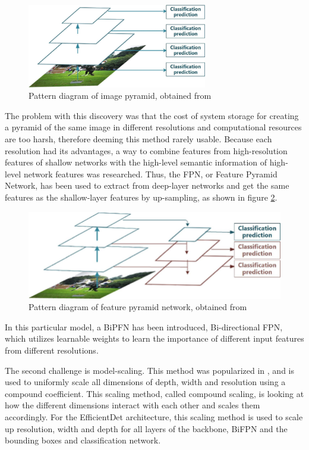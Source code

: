 \begin{figure}[!ht]
    \centering
    \includegraphics[width=0.7\textwidth]{figures/Figure4.png}
    \caption{Pattern diagram of image pyramid, obtained from ~\cite{link13}}
    \label{fig:fig4}
\end{figure}

The problem with this discovery was that the cost of system storage for creating a pyramid of the same image in different resolutions and computational resources are too harsh, therefore deeming this method rarely usable. Because each resolution had its advantages, a way to combine features from high-resolution features of shallow networks with the high-level semantic information of high-level network features was researched. Thus, the FPN, or Feature Pyramid Network, has been used to extract from deep-layer networks and get the same features as the shallow-layer features by up-sampling, as shown in figure \ref{fig:fig5}. 

\begin{figure}[!ht]
    \centering
    \includegraphics[width=0.7\linewidth]{figures/Figure5.png}
    \caption{Pattern diagram of feature pyramid network, obtained from ~\cite{link12}}
    \label{fig:fig5}
\end{figure}

In this particular model, a BiPFN has been introduced, Bi-directional FPN, which utilizes learnable weights to learn the importance of different input features from different resolutions.

The second challenge is model-scaling. This method was popularized in \cite{carte10}, and is used to uniformly scale all dimensions of depth, width and resolution using a compound coefficient. This scaling method, called compound scaling, is looking at how the different dimensions interact with each other and scales them accordingly. For the EfficientDet architecture, this scaling method is used to scale up resolution, width and depth for all layers of the backbone, BiFPN and the bounding boxes and classification network.

